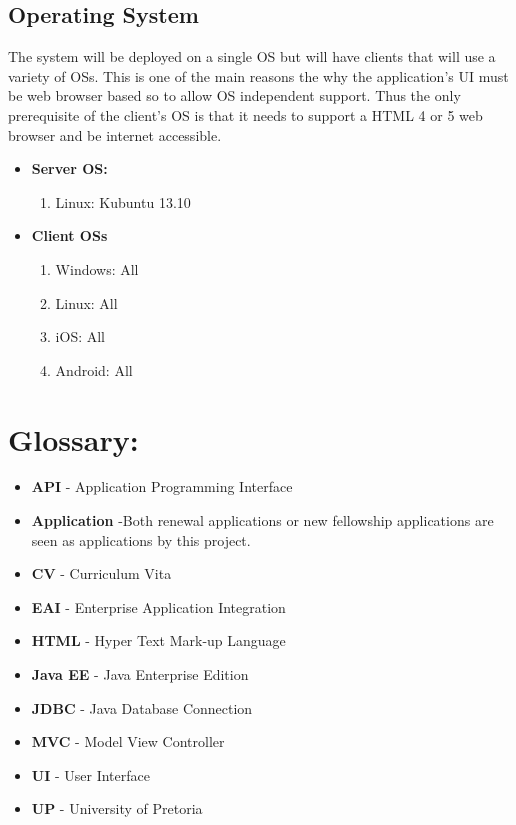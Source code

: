\documentclass[12pt]{article}
\begin{document}
\subsection*{Operating System}

The system will be deployed on a single OS but will have clients that will use a variety of OSs. This is one of the main reasons the why the application's UI must be web browser based so to allow OS independent support. Thus the only prerequisite of the client's OS is that it needs to support a HTML 4 or 5 web browser and be internet accessible.
\begin{itemize}
\item \textbf{Server OS:}
	\begin{enumerate}
		\item Linux: Kubuntu 13.10
	\end{enumerate}
\item \textbf{Client OSs}
	\begin{enumerate}
		\item Windows: All
		\item Linux: All
		\item iOS: All
		\item Android: All
	\end{enumerate}
\end{itemize}
\newpage

\section{Glossary:} %
\vspace{0.2in}

\begin{itemize}

\item \textbf{API} - Application Programming Interface
\item \textbf{Application} -Both renewal applications or new fellowship applications are seen as applications by this project.
\item \textbf{CV} - Curriculum Vita
\item \textbf{EAI} - Enterprise Application Integration
\item \textbf{HTML} - Hyper Text Mark-up Language
\item \textbf{Java EE} - Java Enterprise Edition
\item \textbf{JDBC} - Java Database Connection
\item \textbf{MVC} - Model View Controller
\item \textbf{UI} - User Interface
\item \textbf{UP} - University of Pretoria
 
\end{itemize}	
\end{document}
